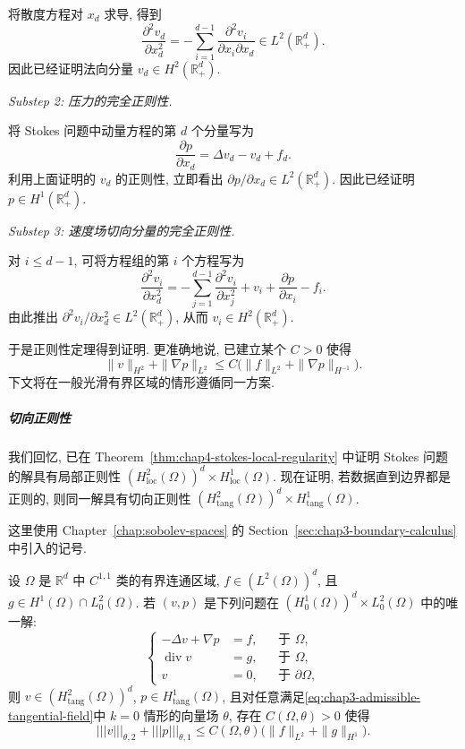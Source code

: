 \begin{Proof}
将散度方程对 $x_d$ 求导, 得到
\[
 \frac{\partial^2v_d}{\partial x_d^2}
 =-\sum_{i=1}^{d-1}\frac{\partial^2v_i}{\partial x_i\partial x_d}
 \in L^2(\mathbb R_+^d).
\]
因此已经证明法向分量 $v_d\in H^2(\mathbb R_+^d)$.

\emph{Substep 2: 压力的完全正则性.}

将 Stokes 问题中动量方程的第 $d$ 个分量写为
\[
 \frac{\partial p}{\partial x_d}=\Delta v_d-v_d+f_d.
\]
利用上面证明的 $v_d$ 的正则性, 立即看出 $\partial p/\partial x_d\in L^2(\mathbb R_+^d)$. 因此已经证明 $p\in H^1(\mathbb R_+^d)$.

\emph{Substep 3: 速度场切向分量的完全正则性.}

对 $i\leq d-1$, 可将方程组的第 $i$ 个方程写为
\[
 \frac{\partial^2v_i}{\partial x_d^2}
 =-\sum_{j=1}^{d-1}\frac{\partial^2v_i}{\partial x_j^2}
 +v_i+\frac{\partial p}{\partial x_i}-f_i.
\]
由此推出 $\partial^2v_i/\partial x_d^2\in L^2(\mathbb R_+^d)$, 从而 $v_i\in H^2(\mathbb R_+^d)$.

于是正则性定理得到证明. 更准确地说, 已建立某个 $C>0$ 使得
\[
 \|v\|_{H^2}+\|\nabla p\|_{L^2}
 \leq C\bigl(\|f\|_{L^2}+\|\nabla p\|_{H^{-1}}\bigr).
\]
下文将在一般光滑有界区域的情形遵循同一方案.
\end{Proof}

\subparagraph{切向正则性}
\label{subsubsec:chap4-stokes-tangential-regularity}
\leavevmode\par

我们回忆, 已在 Theorem~\ref{thm:chap4-stokes-local-regularity} 中证明 Stokes 问题的解具有局部正则性 $(H_{\mathrm{loc}}^2(\Omega))^d\times H_{\mathrm{loc}}^1(\Omega)$. 现在证明, 若数据直到边界都是正则的, 则同一解具有切向正则性 $(H_{\mathrm{tang}}^2(\Omega))^d\times H_{\mathrm{tang}}^1(\Omega)$.

这里使用 Chapter~\ref{chap:sobolev-spaces} 的 Section~\ref{sec:chap3-boundary-calculus} 中引入的记号.

\begin{Theorem}
\label{thm:chap4-stokes-tangential-regularity}
设 $\Omega$ 是 $\mathbb R^d$ 中 $C^{1,1}$ 类的有界连通区域, $f\in(L^2(\Omega))^d$, 且 $g\in H^1(\Omega)\cap L_0^2(\Omega)$. 若 $(v,p)$ 是下列问题在 $(H_0^1(\Omega))^d\times L_0^2(\Omega)$ 中的唯一解:
\[
 \left\{
 \begin{aligned}
  -\Delta v+\nabla p&=f,&&\text{于 }\Omega,\\
  \operatorname{div}v&=g,&&\text{于 }\Omega,\\
  v&=0,&&\text{于 }\partial\Omega,
 \end{aligned}
 \right.
\]
则 $v\in(H_{\mathrm{tang}}^2(\Omega))^d$, $p\in H_{\mathrm{tang}}^1(\Omega)$, 且对任意满足\eqref{eq:chap3-admissible-tangential-field}中 $k=0$ 情形的向量场 $\theta$, 存在 $C(\Omega,\theta)>0$ 使得
\[
 |||v|||_{\theta,2}+|||p|||_{\theta,1}
 \leq C(\Omega,\theta)\bigl(\|f\|_{L^2}+\|g\|_{H^1}\bigr).
\]
\end{Theorem}

